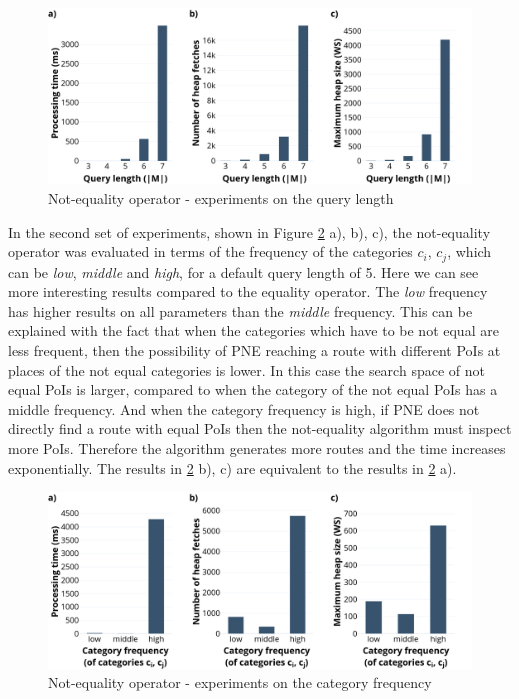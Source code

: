 \begin{figure}[H]
	\includegraphics[scale=0.33]{images/neo_length.png}
	\centering
	\caption{Not-equality operator - experiments on the query length}
	\label{fig:neo_length}
\end{figure}

In the second set of experiments, shown in Figure \ref{fig:neo_frequency} a), b), c), the not-equality operator was evaluated in terms of the frequency of the categories $c_i$, $c_j$, which can be \textit{low}, \textit{middle} and \textit{high}, for a default query length of 5.  
Here we can see more interesting results compared to the equality operator. The \textit{low} frequency has higher results on all parameters than the \textit{middle} frequency. This can be explained with the fact that when the categories which have to be not equal are less frequent, then the possibility of PNE reaching a route with different PoIs at places of the not equal categories is lower. In this case the search space of not equal PoIs is larger, compared to when the category of the not equal PoIs has a middle frequency. And when the category frequency is high, if PNE does not directly find a route with equal PoIs then the not-equality algorithm must inspect more PoIs. Therefore the algorithm generates more routes and the time increases exponentially. 
The results in \ref{fig:neo_frequency} b), c) are equivalent to the results in \ref{fig:neo_frequency} a). 

\begin{figure}[H]
	\includegraphics[scale=0.33]{images/neo_frequency.png}
	\centering
	\caption{Not-equality operator - experiments on the category frequency}
	\label{fig:neo_frequency}
\end{figure}

